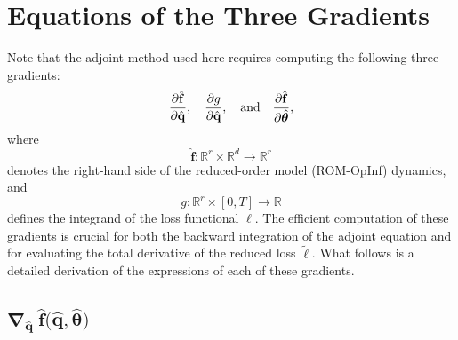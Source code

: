 
\section{Equations of the Three Gradients}
\label{sec:four_gradients}

Note that the adjoint method used here requires computing the following three gradients:\\
$$\pdv{\hat{\mathbf{f}}}{\hat{\mathbf{q}}},  \quad \pdv{g}{\hat{\mathbf{q}}}, \quad \text{and} \quad \pdv{\hat{\mathbf{f}}}{\hat{\bm{\theta}}},$$
where\\
$$\hat{\mathbf{f}}:\mathbb{R}^r \times \mathbb{R}^d \to \mathbb{R}^r$$ 
denotes the right-hand side of the reduced-order model (ROM-OpInf) dynamics, and\\
$$g:\mathbb{R}^r\times [0,T]\to \mathbb{R}$$ 
defines the integrand of the loss functional $\ell$. The efficient computation of these gradients is crucial for both the backward integration of the adjoint equation and for evaluating the total derivative of the reduced loss $\tilde\ell$. What follows is a detailed derivation of the expressions of each of these gradients.

\subsection{$\bm{\nabla}_{\hat{\mathbf{q}}}~\hat{\mathbf{f}}\bigl(\hat{\mathbf{q}}, \hat{\bm{\theta}}\bigr)$}


